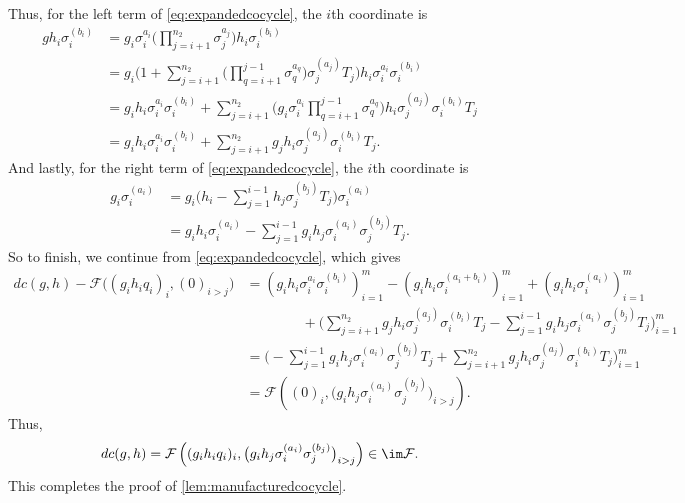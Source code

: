 \documentclass{article}
\numberwithin{equation}{section}
\begin{document}
Thus, for the left term of \autoref{eq:expandedcocycle}, the $i$th coordinate is
\begin{align*}
	gh_i\sigma_i^{(b_i)} &= g_i\sigma_i^{a_i}\Bigg(\prod_{ j=i+1}^{n_2}\sigma_j^{a_j}\Bigg)h_i\sigma_i^{(b_i)} \\
	&= g_i\Bigg(1+\sum_{j=i+1}^{n_2}\Bigg(\prod_{q=i+1}^{j-1}\sigma_q^{a_q}\Bigg)\sigma_j^{(a_j)}T_j\Bigg)h_i\sigma_i^{a_i}\sigma_i^{(b_i)} \\
	&= g_ih_i\sigma_i^{a_i}\sigma_i^{(b_i)}+\sum_{j=i+1}^{n_2}\Bigg(g_i\sigma_i^{a_i}\prod_{q=i+1}^{j-1}\sigma_q^{a_q}\Bigg)h_i\sigma_j^{(a_j)}\sigma_i^{(b_i)}T_j \\
	&= g_ih_i\sigma_i^{a_i}\sigma_i^{(b_i)}+\sum_{j=i+1}^{n_2}g_jh_i\sigma_j^{(a_j)}\sigma_i^{(b_i)}T_j.
\end{align*}
And lastly, for the right term of \autoref{eq:expandedcocycle}, the $i$th coordinate is
\begin{align*}
	g_i\sigma_i^{(a_i)} &= g_i\Bigg(h_i-\sum_{j=1}^{i-1}h_j\sigma_j^{(b_j)}T_j\Bigg)\sigma_i^{(a_i)} \\
	&= g_ih_i\sigma_i^{(a_i)}-\sum_{j=1}^{i-1}g_ih_j\sigma_i^{(a_i)}\sigma_j^{(b_j)}T_j.
\end{align*}
So to finish, we continue from \autoref{eq:expandedcocycle}, which gives
\begin{align*}
	dc(g,h)-\mathcal F\big((g_ih_iq_i)_i,(0)_{i>j}\big) &= \left(g_ih_i\sigma_i^{a_i}\sigma_i^{(b_i)}\right)_{i=1}^m-\left(g_ih_i\sigma_i^{(a_i+b_i)}\right)_{i=1}^m+\left(g_ih_i\sigma_i^{(a_i)}\right)_{i=1}^m \\
	&\qquad\qquad+\Bigg(\sum_{j=i+1}^{n_2}g_jh_i\sigma_j^{(a_j)}\sigma_i^{(b_i)}T_j-\sum_{j=1}^{i-1}g_ih_j\sigma_i^{(a_i)}\sigma_j^{(b_j)}T_j\Bigg)_{i=1}^m \\
	&= \Bigg(-\sum_{j=1}^{i-1}g_ih_j\sigma_i^{(a_i)}\sigma_j^{(b_j)}T_j+\sum_{j=i+1}^{n_2}g_jh_i\sigma_j^{(a_j)}\sigma_i^{(b_i)}T_j\Bigg)_{i=1}^m \\
	&= \mathcal F\left((0)_i,\big(g_ih_j\sigma_i^{(a_i)}\sigma_j^{(b_j)}\big)_{i>j}\right).
\end{align*}
Thus,
\begin{equation}
	dc(g,h) = \mathcal F\left((g_ih_iq_i)_i,\big(g_ih_j\sigma_i^{(a_i)}\sigma_j^{(b_j)}\big)_{i>j}\right)\in\im\mathcal F. \label{eq:computedelta}
\end{equation}
This completes the proof of \autoref{lem:manufacturedcocycle}.
\end{document}

